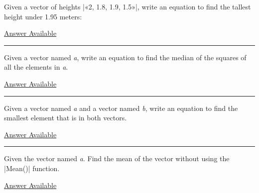 \documentclass[]{memoir}
\newcommand{\FloatTok}[1]{\textcolor[rgb]{0.25,0.63,0.44}{{#1}}}
\newcommand{\FunctionTok}[1]{\textcolor[rgb]{0.02,0.16,0.49}{{#1}}}
\newcommand{\NormalTok}[1]{{#1}}
\begin{document}

Given a vector of heights
|\NormalTok{«2, }\FloatTok{1.8}\NormalTok{, }\FloatTok{1.9}\NormalTok{, }\FloatTok{1.5}\NormalTok{»}|,
write an equation to find the tallest height under 1.95 meters:

\hyperref[Ans-13-4]{Answer Available}

\begin{center}\rule{3in}{0.4pt}\end{center}


Given a vector named \emph{a}, write an equation to find the median of
the squares of all the elements in \emph{a}.

\hyperref[Ans-13-5]{Answer Available}

\begin{center}\rule{3in}{0.4pt}\end{center}


Given a vector named \emph{a} and a vector named \emph{b}, write an
equation to find the smallest element that is in both vectors.

\hyperref[Ans-13-6]{Answer Available}

\begin{center}\rule{3in}{0.4pt}\end{center}


Given the vector named \emph{a}. Find the mean of the vector without
using the |\FunctionTok{Mean}\NormalTok{()}| function.

\hyperref[Ans-13-7]{Answer Available}
\end{document}

